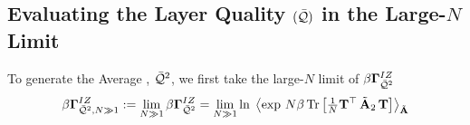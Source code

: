 \subsection{Evaluating the Layer Quality $(\bar{\mathcal{Q}})$ in the Large-$N$ Limit}
\label{sxn:matgen_evaluation_hciz}

To generate the Average \Quality, $\bar{\mathcal{Q}}^{2}$, we first  take the large-$N$ limit of $\beta\mathbf{\Gamma}^{IZ}_{\bar{\mathcal{Q}}^{2}}$
\begin{equation}
  \label{eqn:IZG_limit}
\IZGINF := \lim_{N \gg 1} \IZG 
= \lim_{N \gg 1} \ln \; 
  \Expected[\AECS]{ 
    \exp\,
      N \beta \Trace{\tfrac{1}{N}\TMAT^{\top}\,\AECS_{2}\,\TMAT}
  } 
\end{equation}
